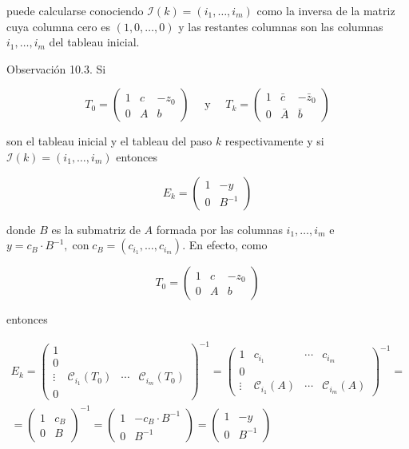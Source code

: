 \documentclass[10pt]{article}
\begin{document}
puede calcularse conociendo $\mathcal{I}(k)=\left(i_{1}, \ldots, i_{m}\right)$ como la inversa de la matriz cuya columna cero es $(1,0, \ldots, 0)$ y las restantes columnas son las columnas $i_{1}, \ldots, i_{m}$ del tableau inicial.

Observación 10.3. Si

$$
T_{0}=\left(\begin{array}{cc|c}
1 & c & -z_{0} \\
0 & A & b
\end{array}\right) \quad \text { y } \quad T_{k}=\left(\begin{array}{cc|c}
1 & \bar{c} & -\bar{z}_{0} \\
0 & \bar{A} & \bar{b}
\end{array}\right)
$$

son el tableau inicial y el tableau del paso $k$ respectivamente y si $\mathcal{I}(k)=\left(i_{1}, \ldots, i_{m}\right)$ entonces

$$
E_{k}=\left(\begin{array}{cc}
1 & -y \\
0 & B^{-1}
\end{array}\right)
$$

donde $B$ es la submatriz de $A$ formada por las columnas $i_{1}, \ldots, i_{m}$ e $y=c_{B} \cdot B^{-1}, \operatorname{con} c_{B}=\left(c_{i_{1}}, \ldots, c_{i_{m}}\right)$. En efecto, como

$$
T_{0}=\left(\begin{array}{cc|c}
1 & c & -z_{0} \\
0 & A & b
\end{array}\right)
$$

entonces

$$
\begin{gathered}
E_{k}=\left(\begin{array}{cccc}
1 & & \\
0 & & & \\
\vdots & \mathcal{C}_{i_{1}}\left(T_{0}\right) & \cdots & \mathcal{C}_{i_{m}}\left(T_{0}\right) \\
0 & &
\end{array}\right)^{-1}=\left(\begin{array}{cccc}
1 & c_{i_{1}} & \cdots & c_{i_{m}} \\
0 & & & \\
\vdots & \mathcal{C}_{i_{1}}(A) & \cdots & \mathcal{C}_{i_{m}}(A)
\end{array}\right)^{-1}= \\
=\left(\begin{array}{cc}
1 & c_{B} \\
0 & B
\end{array}\right)^{-1}=\left(\begin{array}{cc}
1 & -c_{B} \cdot B^{-1} \\
0 & B^{-1}
\end{array}\right)=\left(\begin{array}{cc}
1 & -y \\
0 & B^{-1}
\end{array}\right)
\end{gathered}
$$
\end{document}
